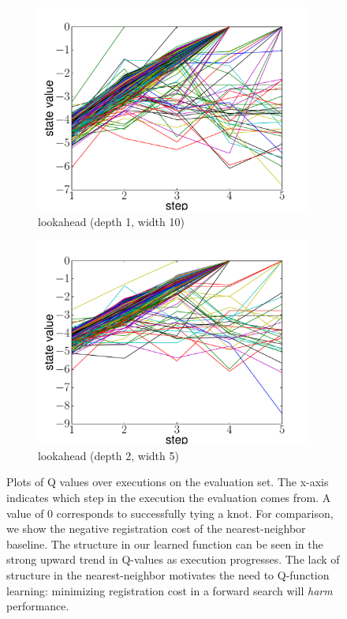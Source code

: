 \begin{figure}
\begin{subfigure}[b]{0.48\linewidth}
    \includegraphics[width=\textwidth]{figures/state_value_lookahead1-10.pdf}
    \caption{lookahead (depth 1, width 10)}
    \label{fig:value_lookahead_1}
  \end{subfigure}
  \begin{subfigure}[b]{0.48\linewidth}
    \includegraphics[width=\textwidth]{figures/state_value_lookahead2-5.pdf}
    \caption{lookahead (depth 2, width 5)}
    \label{fig:value_lookahead_2}
  \end{subfigure}
  \caption{Plots of Q values over executions on the evaluation set. The x-axis indicates which step in the execution
           the evaluation comes from. A value of 0 corresponds to successfully tying a knot. For comparison, we show the 
           negative registration cost of the nearest-neighbor baseline. The structure in our learned function can be seen
           in the strong upward trend in Q-values as execution progresses. The lack of structure in the nearest-neighbor
           motivates the need to Q-function learning: minimizing registration cost in a forward search will \emph{harm} performance.}
  \label{fig:values}
\end{figure}

